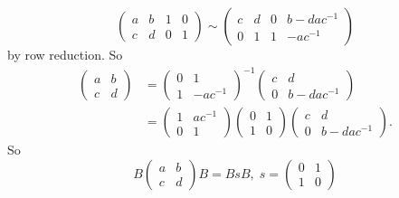 \begin{itemize}
\begin{example}
\begin{equation}
          \begin{pmatrix}
            a&b&1&0\\c&d&0&1
          \end{pmatrix}\sim 
          \begin{pmatrix}
            c&d&0&b-dac^{-1}\\0&1&1&-ac^{-1}
          \end{pmatrix}
        \end{equation}
        by row reduction. So 
        \begin{equation}
            \begin{split}
                \begin{pmatrix}
                    a&b\\c&d
                \end{pmatrix} &=  \begin{pmatrix}
                    0&1\\1&-ac^{-1}
                \end{pmatrix}^{-1} \begin{pmatrix}
                    c&d\\0&b-dac^{-1}
                \end{pmatrix}\\
                &= \begin{pmatrix}
                    1&ac^{-1}\\0&1
                \end{pmatrix}
                 \begin{pmatrix}
                    0&1\\1&0
                \end{pmatrix}
                 \begin{pmatrix}
                    c&d\\0&b-dac^{-1}
                \end{pmatrix}.
            \end{split}
        \end{equation}
        So  
        \begin{equation}
            B \begin{pmatrix}
                    a&b\\c&d
                \end{pmatrix}B = BsB,\; s =  \begin{pmatrix}
                    0&1\\1&0
                \end{pmatrix}
        \end{equation}

\end{example}
\end{itemize}
